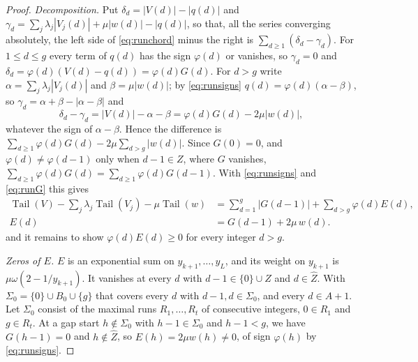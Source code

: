 \documentclass[11pt]{article}
\theoremstyle{definition}
\theoremstyle{plain}
\DeclareMathOperator{\Tail}{Tail}
\begin{document}
\begin{proof}
\emph{Decomposition.}  Put $\delta_d=|V(d)|-|q(d)|$ and
$\gamma_d=\sum_j\lambda_j|V_j(d)|+\mu|w(d)|-|q(d)|$, so that, all the series
converging absolutely, the left side of \eqref{eq:runchord} minus the right is
$\sum_{d\ge1}(\delta_d-\gamma_d)$.  For $1\le d\le g$ every term of $q(d)$ has
the sign $\varphi(d)$ or vanishes, so $\gamma_d=0$ and
$\delta_d=\varphi(d)(V(d)-q(d))=\varphi(d)G(d)$.  For $d>g$ write
$\alpha=\sum_j\lambda_j|V_j(d)|$ and $\beta=\mu|w(d)|$; by \eqref{eq:runsigns}
$q(d)=\varphi(d)(\alpha-\beta)$, so $\gamma_d=\alpha+\beta-|\alpha-\beta|$ and
\[
  \delta_d-\gamma_d=|V(d)|-\alpha-\beta=\varphi(d)G(d)-2\mu|w(d)| ,
\]
whatever the sign of $\alpha-\beta$.  Hence the difference is
$\sum_{d\ge1}\varphi(d)G(d)-2\mu\sum_{d>g}|w(d)|$.  Since $G(0)=0$, and
$\varphi(d)\ne\varphi(d-1)$ only when $d-1\in Z$, where $G$ vanishes,
$\sum_{d\ge1}\varphi(d)G(d)=\sum_{d\ge1}\varphi(d)G(d-1)$.  With
\eqref{eq:runsigns} and \eqref{eq:runG} this gives
\begin{equation}\label{eq:runsplit}
  \begin{aligned}
  \Tail(V)-\sum_j\lambda_j\Tail(V_j)-\mu\Tail(w)
    &=\sum_{d=1}^{g}|G(d-1)|+\sum_{d>g}\varphi(d)E(d),\\
  E(d)&=G(d-1)+2\mu\,w(d).
  \end{aligned}
\end{equation}
and it remains to show $\varphi(d)E(d)\ge0$ for every integer $d>g$.

\emph{Zeros of $E$.}  $E$ is an exponential sum on $y_{k+1},\ldots,y_L$, and
its weight on $y_{k+1}$ is $\mu\omega(2-1/y_{k+1})$.  It vanishes at every $d$
with $d-1\in\{0\}\cup Z$ and $d\in\widehat Z$.  With $\Sigma_0=\{0\}\cup B_0\cup\{g\}$ that
covers every $d$ with $d-1,d\in\Sigma_0$, and every $d\in A+1$.  Let $\Sigma_0$ consist of
the maximal runs $R_1,\ldots,R_t$ of consecutive integers, $0\in R_1$ and
$g\in R_t$.  At a gap start $h\notin\Sigma_0$ with $h-1\in\Sigma_0$ and $h-1<g$, we
have $G(h-1)=0$ and $h\notin\widehat Z$, so $E(h)=2\mu w(h)\ne0$, of sign
$\varphi(h)$ by \eqref{eq:runsigns}.


\end{proof}
\end{document}
